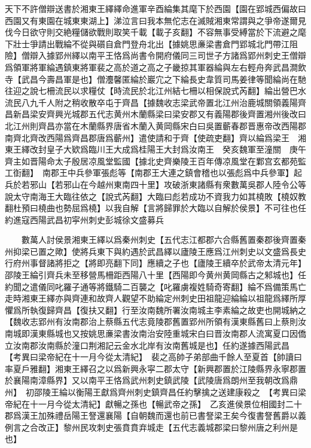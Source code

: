 天下不許僧辯送書於湘東王繹繹命進軍辛酉綸集其麾下於西園【園在郢城西偏故曰西園又有東園在城東東湖上】涕泣言曰我本無佗志在滅賊湘東常謂與之爭帝遂爾見伐今日欲守則交絶糧儲欲戰則取笑千載【載子亥翻】不容無事受縛當於下流避之麾下壯士爭請出戰綸不從與礩自倉門登舟北出【據姚思亷梁書倉門郢城北門帶江阻險】僧辯入據郢州繹以南平王恪爲尚書令開府儀同三司世子方諸爲郢州刺史王僧辯爲領軍將軍綸遇鎮東將軍裴之高於道之高之子畿掠其軍器綸與左右輕舟奔武昌澗飲寺【武昌今壽昌軍是也】僧灋馨匿綸於巖宂之下綸長史韋質司馬姜律等聞綸尚在馳往迎之說七柵流民以求糧仗【時流民於北江州結七柵以相保說式芮翻】綸出營巴水流民八九千人附之稍收散卒屯于齊昌【據魏收志梁武帝置北江州治鹿城關領義陽齊昌新昌梁安齊興光城郡五代志黄州木蘭縣梁曰梁安郡又有義陽郡後齊置湘州後改曰北江州則齊昌亦當在木蘭縣界唐省木蘭入黄岡縣宋白曰吳置蘄春郡晋惠帝改西陽郡南齊北齊改西陽爲齊昌郡唐爲蘄州】遣使請和于齊【使疏吏翻】齊以綸爲梁王　湘東王繹改封皇子大欵爲臨川王大成爲桂陽王大封爲汝南王　癸亥魏軍至潼關　庚午齊主如晋陽命太子殷居凉風堂監國【據北史齊樂陵王百年傳凉風堂在鄴宫玄都苑監工衘翻】　南郡王中兵參軍張彪等【南郡王大連之鎮會稽也以張彪爲中兵參軍】起兵於若邪山【若邪山在今越州東南四十里】攻破浙東諸縣有衆數萬吳郡人陸令公等說太守南海王大臨往依之【說式芮翻】大臨曰彪若成功不資我力如其橈敗【橈奴教翻杜預曰橈曲也勢屈爲橈】以我自解【言將歸罪於大臨以自解於侯景】不可往也任約進寇西陽武昌初寜州刺史彭城徐文盛募兵

　　數萬人討侯景湘東王繹以爲秦州刺史【五代志江都郡六合縣舊置秦郡後齊置秦州抑梁已置之歟】使將兵東下與約遇於武昌繹以廬陵王應爲江州刺史以文盛爲長史行府州事督諸將拒之【將即亮翻下同】應續之子也【廬陵王續卒於武帝太清元年】邵陵王綸引齊兵未至移營馬柵距西陽八十里【西陽即今黄州黄岡縣古之邾城也】任約聞之遣儀同叱羅子通等將鐵騎二百襲之【叱羅虜複姓騎奇寄翻】綸不爲備策馬亡走時湘東王繹亦與齊連和故齊人觀望不助綸定州刺史田祖龍迎綸綸以祖龍爲繹所厚懼爲所執復歸齊昌【復扶又翻】行至汝南魏所署汝南城主李素綸之故吏也開城納之【魏收志郢州有汝南郡治上蔡縣五代志竟陵郡舊置郢州所領有漢東縣舊曰上蔡則汝南城即漢東縣城也又按姚思亷梁書汝南治安陸重城宋白曰晋汝南郡人流寓夏口因僑立汝南郡汝南縣於潼口荆湘記云金水北岸有汝南舊城是也】任約遂據西陽武昌　【考異曰梁帝紀在十一月今從太清紀】　裴之高帥子弟部曲千餘人至夏首【帥讀曰率夏戶雅翻】湘東王繹召之以爲新興永寜二郡太守【新興郡置於江陵縣界永寧郡置於襄陽南漳縣界】又以南平王恪爲武州刺史鎮武陵【武陵唐爲朗州至我朝改爲鼎州】　初邵陵王綸以衡陽王獻爲齊州刺史鎮齊昌任約擊擒之送建康殺之　【考異曰梁帝紀在十一月今從太清紀】獻暢之孫也【暢武帝之孫】　乙亥進侯景位相國封二十郡爲漢王加殊禮岳陽王詧還襄陽【自朝魏而還也前已書詧梁王矣今復書詧舊爵以義例言之合改正】黎州民攻刺史張賁賁弃城走【五代志義城郡梁曰黎州唐之利州是也】

